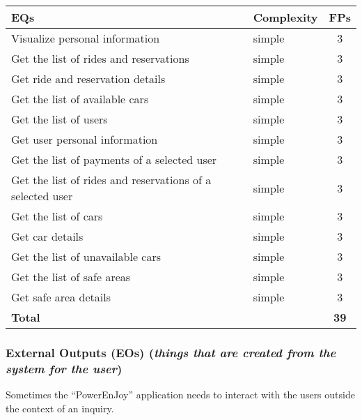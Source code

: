 \begin{center}
	\begin{tabular}{|l|l|c|}
		\hline
		\textbf{EQs} 	& \textbf{Complexity} 	& \textbf{FPs} \\
		\hline
		Visualize personal information 	& simple 	& 3 \\
		Get the list of rides and reservations 	& simple 	& 3 \\
		Get ride and reservation details 	& simple 	& 3 \\
		Get the list of available cars 	& simple 	& 3 \\
		Get the list of users 	& simple 	& 3 \\
		Get user personal information 	& simple 	& 3 \\
		Get the list of payments of a selected user 	& simple 	& 3\\
		Get the list of rides and reservations of a selected user 	& simple 	& 3 \\
		Get the list of cars 	& simple 	& 3 \\
		Get car details 	& simple 	& 3 \\
		Get the list of unavailable cars 	& simple 	& 3 \\
		Get the list of safe areas 	& simple 	& 3 \\
		Get safe area details 	& simple 	& 3 \\
		\hline \hline
		\textbf{Total} 	& 	& \textbf{39} \\
		\hline
	\end{tabular}
\end{center}

\subsubsection{External Outputs (EOs) (\textit{things that are created from the system for the user})}

Sometimes the ``PowerEnJoy'' application needs to interact with the users outside the context of an inquiry.

